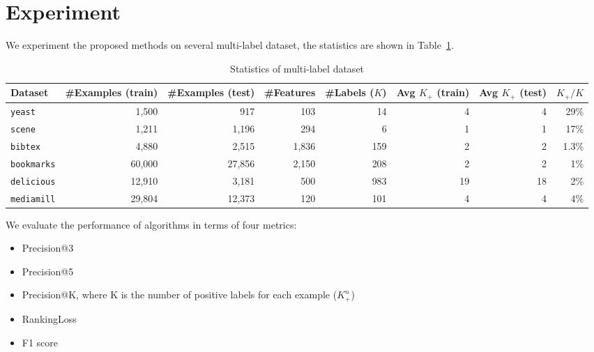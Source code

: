 \section{Experiment}
\label{sec:experiment}

We experiment the proposed methods on several multi-label dataset, the statistics are shown in Table~\ref{tab:dataset}.

\begin{table}[!h]
\centering
\caption{Statistics of multi-label dataset}
\label{tab:dataset}
\begin{tabular}{l*{7}{r}} \hline \hline
Dataset & \#Examples (train) & \#Examples (test) & \#Features & \#Labels ($K$) & Avg $K_+$ (train) & Avg $K_+$ (test) & $K_+ / K$ \\ \hline
\texttt{yeast}     & 1,500  & 917    & 103  & 14  & 4  & 4  & 29\%  \\
\texttt{scene}     & 1,211  & 1,196  & 294  & 6   & 1  & 1  & 17\%  \\ 
\texttt{bibtex}    & 4,880  & 2,515  & 1,836 & 159 & 2  & 2  & 1.3\% \\
\texttt{bookmarks} & 60,000 & 27,856 & 2,150 & 208 & 2  & 2  & 1\%   \\
\texttt{delicious} & 12,910 & 3,181  & 500  & 983 & 19 & 18 & 2\%   \\
\texttt{mediamill} & 29,804 & 12,373 & 120  & 101 & 4  & 4  & 4\%   \\
\hline
\end{tabular}
\end{table}

\noindent
We evaluate the performance of algorithms in terms of four metrics:
\begin{itemize}
\item Precision@3
\item Precision@5
\item Precision@K, where K is the number of positive labels for each example (\ie $K_+^n$)
\item RankingLoss
\item F1 score
\end{itemize}

